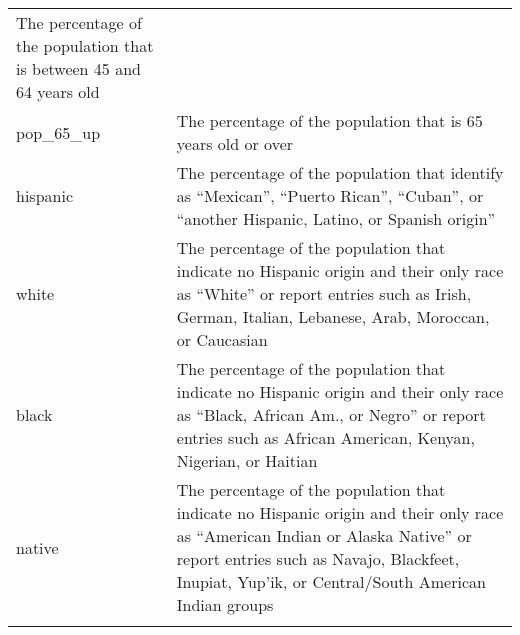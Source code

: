 \documentclass[12pt,twoside]{reedthesis}
\theoremstyle{definition}
\theoremstyle{definition}
\theoremstyle{definition}
\theoremstyle{remark}
\begin{document}
\begin{longtable}[]{@{}ll@{}}
\begin{minipage}[t]{0.50\columnwidth}
The percentage of the population that is between 45 and 64 years
old\strut
\end{minipage}\tabularnewline
\begin{minipage}[t]{0.44\columnwidth}\raggedright
pop\_65\_up\strut
\end{minipage} & \begin{minipage}[t]{0.50\columnwidth}\raggedright
The percentage of the population that is 65 years old or over\strut
\end{minipage}\tabularnewline
\begin{minipage}[t]{0.44\columnwidth}\raggedright
hispanic\strut
\end{minipage} & \begin{minipage}[t]{0.50\columnwidth}\raggedright
The percentage of the population that identify as ``Mexican'', ``Puerto
Rican'', ``Cuban'', or ``another Hispanic, Latino, or Spanish
origin''\strut
\end{minipage}\tabularnewline
\begin{minipage}[t]{0.44\columnwidth}\raggedright
white\strut
\end{minipage} & \begin{minipage}[t]{0.50\columnwidth}\raggedright
The percentage of the population that indicate no Hispanic origin and
their only race as ``White'' or report entries such as Irish, German,
Italian, Lebanese, Arab, Moroccan, or Caucasian\strut
\end{minipage}\tabularnewline
\begin{minipage}[t]{0.44\columnwidth}\raggedright
black\strut
\end{minipage} & \begin{minipage}[t]{0.50\columnwidth}\raggedright
The percentage of the population that indicate no Hispanic origin and
their only race as ``Black, African Am., or Negro'' or report entries
such as African American, Kenyan, Nigerian, or Haitian\strut
\end{minipage}\tabularnewline
\begin{minipage}[t]{0.44\columnwidth}\raggedright
native\strut
\end{minipage} & \begin{minipage}[t]{0.50\columnwidth}\raggedright
The percentage of the population that indicate no Hispanic origin and
their only race as ``American Indian or Alaska Native'' or report
entries such as Navajo, Blackfeet, Inupiat, Yup'ik, or Central/South
American Indian groups\strut
\end{minipage}\tabularnewline
\begin{minipage}[t]{0.44\columnwidth}\raggedright

\end{minipage}
\end{longtable}
\end{document}
